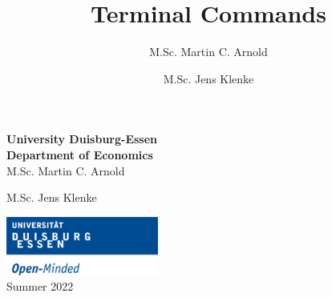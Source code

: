\documentclass[landscape]{article}
\author{\Large M.Sc. Martin C.
Arnold\vspace{0.05in} \newline\normalsize\emph{}   \and \Large M.Sc.
Jens Klenke\vspace{0.05in} \newline\normalsize\emph{}  }
\title{\center Terminal Commands  }
\date{}
\begin{document}
	
%    


{%

{

\vskip 10pt\relax \normalsize\fontsize{11}{12}

\begin{minipage}[t]{.49\textwidth}
 \vspace{-1.75cm}
 \textbf{University Duisburg-Essen}\\
 \textbf{Department of Economics}\\

M.Sc. Martin C. Arnold \hskip 15pt \emph{\small }   \par M.Sc. Jens
Klenke \hskip 15pt \emph{\small }   
\end{minipage}%
%
\hfill
%
\begin{minipage}[t]{.49\textwidth}
  \begin{flushright}
  	\includegraphics*[width=5cm]{assets/duelogo_en.png}\\
	\vspace{.25cm}
    Summer 2022\\
  \end{flushright}
\end{minipage}

\vspace{20pt}

}

\setlength{\parindent}{0pt}
\thispagestyle{plain}
{\fontsize{10}{10}\selectfont\raggedright 
{\let\newpage\relax\maketitle}

}


}

\vskip 8.5pt
\end{document}
